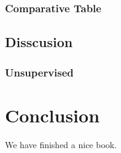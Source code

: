 \documentclass[
]{book}
\begin{document}
\hypertarget{comparative-table}{%
\subsection{Comparative Table}\label{comparative-table}}

\hypertarget{disscusion}{%
\section{Disscusion}\label{disscusion}}

\hypertarget{unsupervised}{%
\subsection{Unsupervised}\label{unsupervised}}

\hypertarget{conclusion}{%
\chapter{Conclusion}\label{conclusion}}

We have finished a nice book.
\end{document}

